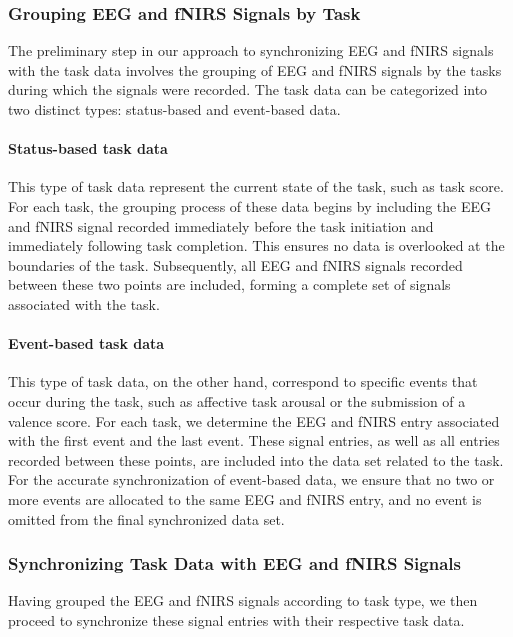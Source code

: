 \subsubsection{Grouping EEG and fNIRS Signals by Task}

The preliminary step in our approach to synchronizing EEG and fNIRS signals
with the task data involves the grouping of EEG and fNIRS signals by the tasks
during which the signals were recorded. The task data can be categorized into
two distinct types: status-based and event-based data.

\paragraph{Status-based task data} This type of task data represent the current
state of the task, such as task score. For each task, the grouping process of
these data begins by including the EEG and fNIRS signal recorded immediately
before the task initiation and immediately following task completion. This
ensures no data is overlooked at the boundaries of the task. Subsequently, all
EEG and fNIRS signals recorded between these two points are included, forming a
complete set of signals associated with the task.

\paragraph{Event-based task data} This type of task data, on the other hand,
correspond to specific events that occur during the task, such as affective
task arousal or the submission of a valence score. For each task, we determine
the EEG and fNIRS entry associated with the first event and the last event.
These signal entries, as well as all entries recorded between these points, are
included into the data set related to the task. For the accurate
synchronization of event-based data, we ensure that no two or more events are
allocated to the same EEG and fNIRS entry, and no event is omitted from the
final synchronized data set.

\subsubsection{Synchronizing Task Data with EEG and fNIRS Signals}

Having grouped the EEG and fNIRS signals according to task type, we then
proceed to synchronize these signal entries with their respective task data.

